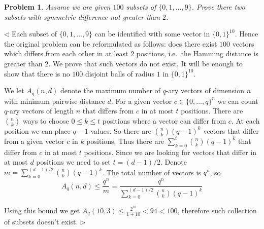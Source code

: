 \documentclass[12pt]{article}
\newtheorem{problem}{Problem}[subsection]
\newenvironment{solution}{\par $\triangleleft$}{$\triangleright$}
\begin{document}
\begin{problem} Assume we are given $100$ subsets of $\{0,1,\ldots,9\}$. Prove
there two subsets with symmetric difference not greater than $2$.
\end{problem}
\begin{solution} Each subset of $\{0,1,\dots, 9\}$ can be identified with some
    vector in ${\{0,1 \}}^{10}$. Hence the original problem can be reformulated
    as follows: does there exist $100$ vectors which differs from each other in
    at least $2$ positions, i.e.\ the Hamming distance is greater than $2$. We
    prove that such vectors do not exist. It will be enough to show that there
    is no $100$ disjoint balls of radius $1$ in ${\{0, 1 \}}^{10}$.


    We let $A_q(n,d)$ denote the maximum number of $q$-ary vectors of dimension
    $n$ with minimum pairwise distance $d$. For a given vector 
    $c\in {\{0,\ldots,q \}}^n$ we can count $q$-ary vectors 
    of length $n$ that differs from $c$ in at most $t$ positions. 
    There are $\binom{n}{k}$ ways to choose
    $0\leq k\leq t$ positions where a vector can differ from $c$. At each
    position we can place $q-1$ values. So there are $\binom{n}{k}{(q-1)}^k$
    vectors that differ from a given vector $c$ in $k$ positions. Thus there are
    $\sum_{k=0}^ t\binom{n}{k}{(q-1)}^k$ that differ from $c$ in at most $t$
    positions. Since we are looking for vectors that differ in at most $d$
    positions we need to set $t=(d-1)/2$. Denote
    $m=\sum_{k=0}^{(d-1)/2}\binom{n}{k}{(q-1)}^k$. The total number of vectors
    is $q^n$, so
    $$
        A_q(n,d)\leq\frac{q^n}{m}
        =\frac{q^n}{\sum_{k=0}^{(d-1)/2}\binom{n}{k}{(q-1)}^k}
    $$

    Using this bound we get $A_2(10,3) \leq \frac{2^{10}}{1 + 10} < 94<100$,
    therefore such collection of subsets doesn't exist.
\end{solution}
\end{document}
